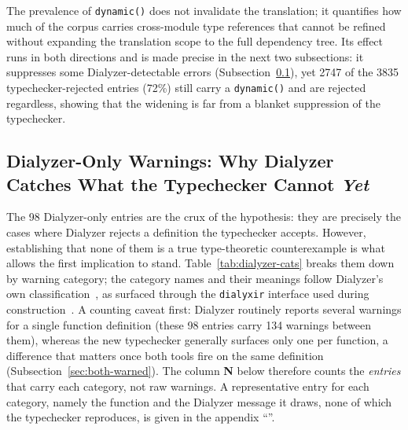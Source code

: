 The prevalence of \texttt{dynamic()} does not invalidate the translation; it quantifies how much of the corpus carries cross-module type references that cannot be refined without expanding the translation scope to the full dependency tree.
Its effect runs in both directions and is made precise in the next two subsections: it suppresses some Dialyzer-detectable errors (Subsection~\ref{sec:dialyzer-only}), yet \num{2747} of the \num{3835} typechecker-rejected entries (72\%) still carry a \texttt{dynamic()} and are rejected regardless, showing that the widening is far from a blanket suppression of the typechecker.

\subsection{Dialyzer-Only Warnings: Why Dialyzer Catches What the Typechecker Cannot \emph{Yet}}
\label{sec:dialyzer-only}

The 98 Dialyzer-only entries are the crux of the hypothesis: they are precisely the cases where Dialyzer rejects a definition the typechecker accepts.
However, establishing that none of them is a true type-theoretic counterexample is what allows the first implication to stand.
Table~\ref{tab:dialyzer-cats} breaks them down by warning category; the category names and their meanings follow Dialyzer's own classification~\cite{dialyzer-manual}, as surfaced through the \texttt{dialyxir} interface used during construction~\cite{dialyxir}.
A counting caveat first: Dialyzer routinely reports several warnings for a single function definition (these 98 entries carry 134 warnings between them), whereas the new typechecker generally surfaces only one per function, a difference that matters once both tools fire on the same definition (Subsection~\ref{sec:both-warned}).
The column \textbf{N} below therefore counts the \emph{entries} that carry each category, not raw warnings.
A representative entry for each category, namely the function and the Dialyzer message it draws, none of which the typechecker reproduces, is given in the appendix ``''.

